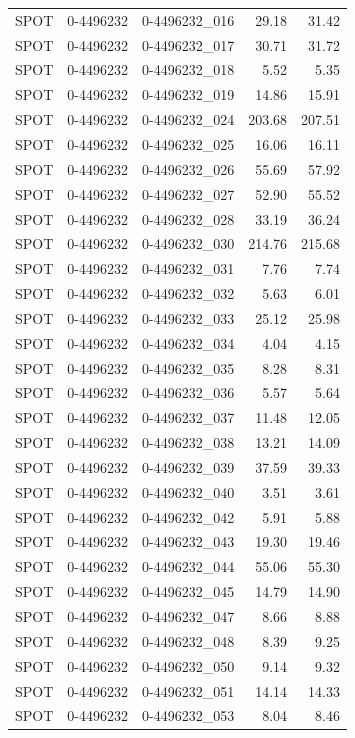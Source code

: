\begin{tabular}{lllrr}
SPOT & 0-4496232 & 0-4496232_016 & 29.18 & 31.42 \\
SPOT & 0-4496232 & 0-4496232_017 & 30.71 & 31.72 \\
SPOT & 0-4496232 & 0-4496232_018 & 5.52 & 5.35 \\
SPOT & 0-4496232 & 0-4496232_019 & 14.86 & 15.91 \\
SPOT & 0-4496232 & 0-4496232_024 & 203.68 & 207.51 \\
SPOT & 0-4496232 & 0-4496232_025 & 16.06 & 16.11 \\
SPOT & 0-4496232 & 0-4496232_026 & 55.69 & 57.92 \\
SPOT & 0-4496232 & 0-4496232_027 & 52.90 & 55.52 \\
SPOT & 0-4496232 & 0-4496232_028 & 33.19 & 36.24 \\
SPOT & 0-4496232 & 0-4496232_030 & 214.76 & 215.68 \\
SPOT & 0-4496232 & 0-4496232_031 & 7.76 & 7.74 \\
SPOT & 0-4496232 & 0-4496232_032 & 5.63 & 6.01 \\
SPOT & 0-4496232 & 0-4496232_033 & 25.12 & 25.98 \\
SPOT & 0-4496232 & 0-4496232_034 & 4.04 & 4.15 \\
SPOT & 0-4496232 & 0-4496232_035 & 8.28 & 8.31 \\
SPOT & 0-4496232 & 0-4496232_036 & 5.57 & 5.64 \\
SPOT & 0-4496232 & 0-4496232_037 & 11.48 & 12.05 \\
SPOT & 0-4496232 & 0-4496232_038 & 13.21 & 14.09 \\
SPOT & 0-4496232 & 0-4496232_039 & 37.59 & 39.33 \\
SPOT & 0-4496232 & 0-4496232_040 & 3.51 & 3.61 \\
SPOT & 0-4496232 & 0-4496232_042 & 5.91 & 5.88 \\
SPOT & 0-4496232 & 0-4496232_043 & 19.30 & 19.46 \\
SPOT & 0-4496232 & 0-4496232_044 & 55.06 & 55.30 \\
SPOT & 0-4496232 & 0-4496232_045 & 14.79 & 14.90 \\
SPOT & 0-4496232 & 0-4496232_047 & 8.66 & 8.88 \\
SPOT & 0-4496232 & 0-4496232_048 & 8.39 & 9.25 \\
SPOT & 0-4496232 & 0-4496232_050 & 9.14 & 9.32 \\
SPOT & 0-4496232 & 0-4496232_051 & 14.14 & 14.33 \\
SPOT & 0-4496232 & 0-4496232_053 & 8.04 & 8.46 \\

\end{tabular}
